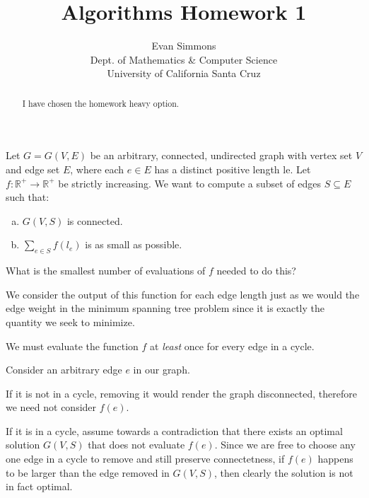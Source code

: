 \documentclass{amsart}
\theoremstyle{definition}
\theoremstyle{remark}
\numberwithin{equation}{section}
\newcommand{\RR}{\mathbb R}
\begin{document}
\title[]{Algorithms Homework 1}%
\author{Evan Simmons \\
        Dept. of Mathematics \& Computer Science \\ University of California Santa Cruz}%
\renewcommand{\abstractname}{Homework Option}
\begin{abstract}
I have chosen the homework heavy option.
\end{abstract}
\maketitle

\section{} Let $G = G(V, E)$ be an arbitrary, connected, undirected graph with
vertex set $V$ and edge set $E$, where each $e \in E$ has a distinct
positive length le. Let $f : \RR^+ \rightarrow \RR^+$ be strictly
increasing. We want to compute a subset of edges $S \subseteq E$ such
that:

\begin{enumerate}[(a)]
  \item $G(V,S)$ is connected.
  \item $\sum_{e \in S} f(l_e)$ is as small as possible.
\end{enumerate}

What is the smallest number of evaluations of $f$ needed to do this?

\rmkstar We consider the output of this function for each edge length just
as we would the edge weight in the minimum spanning tree problem since
it is exactly the quantity we seek to minimize.

\claimstar We must evaluate the function $f$ at \textit{least} once for every
edge in a cycle.

\proof Consider an arbitrary edge $e$ in our graph.

If it is not in a cycle, removing it would render the graph
disconnected, therefore we need not consider $f(e)$.

If it is in a cycle, assume towards a contradiction that there exists
an optimal solution $G(V,S)$ that does not evaluate $f(e)$. Since we
are free to choose any one edge in a cycle to remove and still preserve
connectetness, if $f(e)$ happens to be larger than the edge removed in
$G(V,S)$, then clearly the solution is not in fact optimal.
\end{document}
